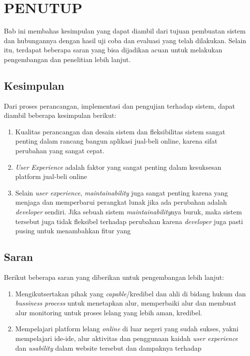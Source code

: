 \chapter{PENUTUP}
  Bab ini membahas kesimpulan yang dapat diambil dari tujuan pembuatan sistem dan hubungannya dengan hasil uji coba dan evaluasi yang telah dilakukan. Selain itu, terdapat beberapa saran yang bisa dijadikan acuan untuk melakukan pengembangan dan penelitian lebih lanjut.
  \section{Kesimpulan}
  Dari proses perancangan, implementasi dan pengujian terhadap sistem, dapat diambil beberapa kesimpulan berikut:
  \begin{enumerate}
    \item Kualitas perancangan dan desain sistem dan fleksibilitas sistem sangat penting dalam rancang bangun aplikasi jual-beli online, karena sifat perubahan yang sangat cepat.
    \item \textit{User Experience} adalah faktor yang sangat penting dalam kesuksesan platform jual-beli online
    \item Selain \textit{user experience}, \textit{maintainability} juga sangat penting karena yang menjaga dan memperbarui perangkat lunak jika ada perubahan adalah \textit{developer} sendiri. Jika sebuah sistem \textit{maintainability}nya buruk, maka sistem tersebut juga tidak fleksibel terhadap perubahan karena \textit{developer} juga pasti pusing untuk menambahkan fitur yang 
  \end{enumerate}
  
  \section{Saran}
  Berikut beberapa saran yang diberikan untuk pengembangan lebih lanjut:
  \begin{enumerate}
    \item Mengikutsertakan pihak yang \textit{capable}/kredibel dan ahli di bidang hukum dan \textit{bussiness process} untuk menetapkan alur, memperbaiki alur dan membuat alur monitoring untuk proses lelang yang lebih aman, kredibel.
    \item Mempelajari platform lelang \textit{online} di luar negeri yang sudah sukses, yakni mempelajari ide-ide, alur aktivitas dan penggunaan kaidah \textit{user experience} dan \textit{usability} dalam website tersebut dan dampaknya terhadap 
  \end{enumerate}
  
